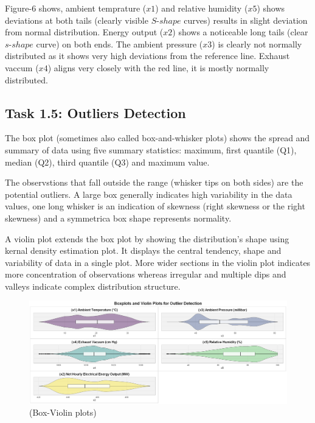 \documentclass[12pt,a4paper]{article}
\begin{document}
Figure-6 shows, ambient 
temprature ($x1$) and relative humidity ($x5$) shows deviations at both 
tails (clearly visible $S$-$shape$ curves) results in slight deviation from normal distribution. 
Energy output ($x2$) shows a noticeable long tails (clear $s$-$shape$ curve) on both ends. The ambient pressure ($x3$) 
is clearly not normally distributed as it shows very high deviations from the
reference line. Exhaust vaccum ($x4$) aligns very 
closely with the red line, it is mostly normally distributed. 


\subsection*{Task 1.5: Outliers Detection}
 
The box plot (sometimes also called box-and-whisker plots) shows the spread and summary of data using five 
summary statistics: maximum, first quantile (Q1), median (Q2), third quantile (Q3)
and maximum value. %

The observstions that fall outside the range (whisker tips on both sides) are the potential outliers.
A large box generally indicates high variability in the data values, one long whisker is an indication
of skewness (right skewness or the right skewness) and a symmetrica box shape represents normality.

A violin plot extends the box plot by showing the 
distribution's shape using kernal density estimation plot. It displays the central tendency,
shape and variability of data in a single plot. More wider sections in the violin plot 
indicates more concentration of observations whereas irregular and multiple dips and valleys 
indicate complex distribution structure.

\begin{figure}[H]
  \centering
  \includegraphics[width=\textwidth]{z9.png}
  \caption{(Box-Violin plots)}
  \label{fig:Outlier Detection}
\end{figure}
\end{document}
